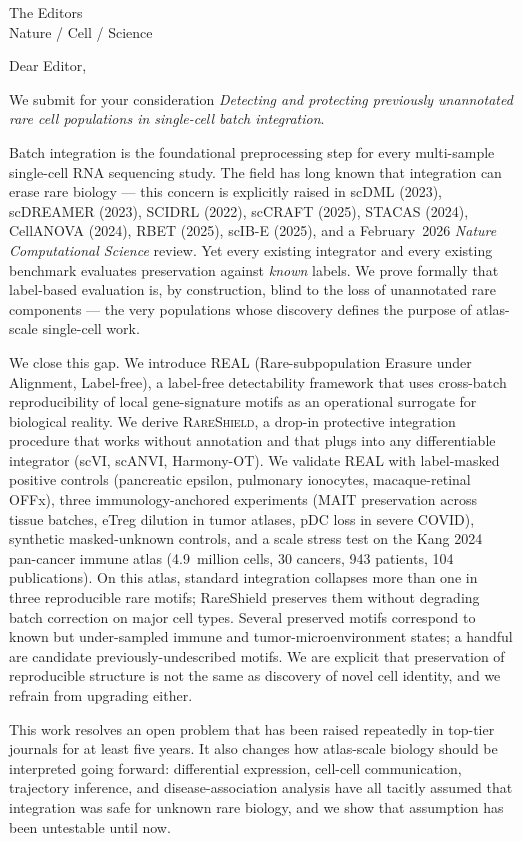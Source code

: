 \documentclass[11pt]{letter}
\begin{document}
\begin{letter}{The Editors \\ Nature / Cell / Science}

\opening{Dear Editor,}

We submit for your consideration \emph{Detecting and protecting previously unannotated rare cell populations in single-cell batch integration}.

Batch integration is the foundational preprocessing step for every multi-sample single-cell RNA sequencing study. The field has long known that integration can erase rare biology --- this concern is explicitly raised in scDML (2023), scDREAMER (2023), SCIDRL (2022), scCRAFT (2025), STACAS (2024), CellANOVA (2024), RBET (2025), scIB-E (2025), and a February~2026 \emph{Nature Computational Science} review. Yet every existing integrator and every existing benchmark evaluates preservation against \emph{known} labels. We prove formally that label-based evaluation is, by construction, blind to the loss of unannotated rare components --- the very populations whose discovery defines the purpose of atlas-scale single-cell work.

We close this gap. We introduce \textsc{REAL} (Rare-subpopulation Erasure under Alignment, Label-free), a label-free detectability framework that uses cross-batch reproducibility of local gene-signature motifs as an operational surrogate for biological reality. We derive \textsc{RareShield}, a drop-in protective integration procedure that works without annotation and that plugs into any differentiable integrator (scVI, scANVI, Harmony-OT).  We validate REAL with label-masked positive controls (pancreatic epsilon, pulmonary ionocytes, macaque-retinal OFFx), three immunology-anchored experiments (MAIT preservation across tissue batches, eTreg dilution in tumor atlases, pDC loss in severe COVID), synthetic masked-unknown controls, and a scale stress test on the Kang 2024 pan-cancer immune atlas (4.9~million cells, 30 cancers, 943 patients, 104 publications).  On this atlas, standard integration collapses more than one in three reproducible rare motifs; RareShield preserves them without degrading batch correction on major cell types.  Several preserved motifs correspond to known but under-sampled immune and tumor-microenvironment states; a handful are candidate previously-undescribed motifs.  We are explicit that preservation of reproducible structure is not the same as discovery of novel cell identity, and we refrain from upgrading either.

This work resolves an open problem that has been raised repeatedly in top-tier journals for at least five years.  It also changes how atlas-scale biology should be interpreted going forward: differential expression, cell-cell communication, trajectory inference, and disease-association analysis have all tacitly assumed that integration was safe for unknown rare biology, and we show that assumption has been untestable until now.


\end{letter}
\end{document}
